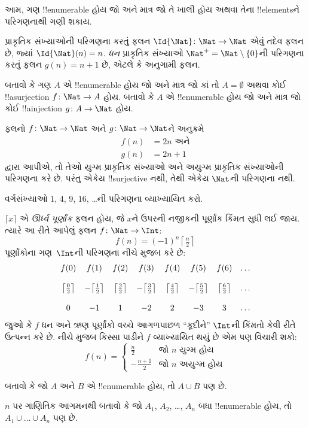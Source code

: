 \documentclass[../../../include/open-logic-section]{subfiles}
\begin{document}
\begin{explain}
આમ, ગણ !!{enumerable} હોય જો અને માત્ર જો તે ખાલી હોય અથવા તેના
!!{element}sને પરિગણનાથી ગણી શકાય.
\end{explain}

\begin{ex}
પ્રાકૃતિક સંખ્યાઓની પરિગણના કરતું ફલન
$\Id{\Nat} \colon \Nat \to \Nat$ એવું તદેવ ફલન છે, જ્યાં
$\Id{\Nat}(n) = n$. \emph{ધન} પ્રાકૃતિક સંખ્યાઓ
$\Nat^+ = \Nat \setminus \{0\}$ની પરિગણના કરતું ફલન
$g(n) = n + 1$ છે, એટલે કે અનુગામી ફલન.
\end{ex}

\begin{prob}
બતાવો કે ગણ $A$ એ !!{enumerable} હોય જો અને માત્ર જો કાં તો
$A = \emptyset$ અથવા કોઈ !!a{surjection} $f\colon \Nat \to A$ હોય.
બતાવો કે $A$ એ !!{enumerable} હોય જો અને માત્ર જો કોઈ
!!a{injection} $g\colon A \to \Nat$ હોય.
\end{prob}

\begin{ex}
ફલનો $f\colon \Nat \to \Nat$ અને $g \colon \Nat \to \Nat$ને
અનુક્રમે
\begin{align*}
  f(n) & = 2n \text{ અને}\\
  g(n) & = 2n+1
\end{align*}
દ્વારા આપીએ, તો તેઓ યુગ્મ પ્રાકૃતિક સંખ્યાઓ અને અયુગ્મ પ્રાકૃતિક
સંખ્યાઓની પરિગણના કરે છે. પરંતુ એકેય !!{surjective} નથી, તેથી
એકેય $\Nat$ની પરિગણના નથી.
\end{ex}

\begin{prob}
વર્ગસંખ્યાઓ $1$, $4$, $9$, $16$, \dots{}ની પરિગણના વ્યાખ્યાયિત કરો.
\end{prob}

\begin{ex}
$\lceil x \rceil$ એ \emph{ઊર્ધ્વ પૂર્ણાંક} ફલન હોય, જે $x$ને
ઉપરની નજીકની પૂર્ણાંક કિંમત સુધી લઈ જાય. ત્યારે આ રીતે આપેલું
ફલન $f \colon \Nat \to \Int$:
\[
  f(n) = (-1)^{n} \left\lceil\tfrac{n}{2}\right\rceil
\]
પૂર્ણાંકોના ગણ~$\Int$ની પરિગણના નીચે મુજબ કરે છે:
\[
\begin{array}{c c c c c c c c}
f(0) & f(1) & f(2) & f(3) & f(4) & f(5) & f(6) & \dots \\ \\
\big\lceil \tfrac{0}{2} \big\rceil & -\big\lceil \tfrac{1}{2}\big\rceil &  \big\lceil \tfrac{2}{2} \big\rceil & -\big\lceil \tfrac{3}{2} \big\rceil & \big\lceil \tfrac{4}{2} \big\rceil  & -\big\lceil \tfrac{5}{2}\big\rceil & \big\lceil \tfrac{6}{2} \big\rceil & \dots \\ \\
0 & -1 & 1 & -2 & 2 & -3 & 3& \dots
\end{array}
\]
જુઓ કે $f$ ધન અને ઋણ પૂર્ણાંકો વચ્ચે આગળપાછળ “કૂદીને” $\Int$ની
કિંમતો કેવી રીતે ઉત્પન્ન કરે છે. નીચે મુજબ કિસ્સા પાડીને $f$
વ્યાખ્યાયિત થયું છે એમ પણ વિચારી શકો:
\[
f(n) = \begin{cases}
  \frac{n}{2} & \text{જો $n$ યુગ્મ હોય}\\
  -\frac{n+1}{2} & \text{જો $n$ અયુગ્મ હોય}
  \end{cases}
\]
\end{ex}

\begin{prob}
બતાવો કે જો $A$ અને $B$ એ !!{enumerable} હોય, તો $A \cup B$ પણ છે.
\end{prob}

\begin{prob}
$n$ પર ગાણિતિક આગમનથી બતાવો કે જો $A_1$, $A_2$, \dots, $A_n$
બધા !!{enumerable} હોય, તો $A_1 \cup \dots \cup A_n$ પણ છે.
\end{prob}
\end{document}
